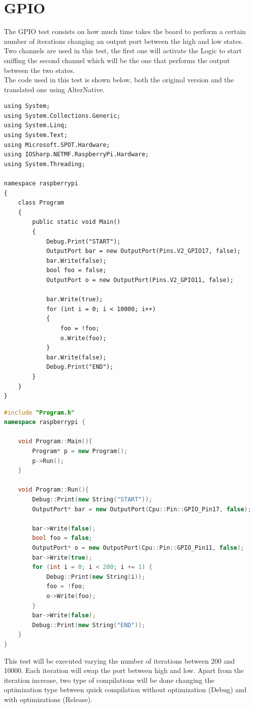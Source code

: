 \section{GPIO}\label{SS:IOEx-GPIO}
The GPIO test consists on how much time takes the board to perform a certain number of iterations changing an output port between the high and low states. Two channels are used in this test, the first one will activate the Logic to start sniffing the second channel which will be the one that performs the output between the two states.
\\
The code used in this test is shown below, both the original version and the translated one using AlterNative.
\begin{lstlisting}[language=CSharp, caption={GPIO Performance test in C\#}]
using System;
using System.Collections.Generic;
using System.Linq;
using System.Text;
using Microsoft.SPOT.Hardware;
using IOSharp.NETMF.RaspberryPi.Hardware;
using System.Threading;

namespace raspberrypi
{
    class Program
    {
        public static void Main()
        {
            Debug.Print("START");
            OutputPort bar = new OutputPort(Pins.V2_GPIO17, false);
            bar.Write(false);
            bool foo = false;
            OutputPort o = new OutputPort(Pins.V2_GPIO11, false);

            bar.Write(true);
            for (int i = 0; i < 10000; i++)
            {
                foo = !foo;
                o.Write(foo);
            }
            bar.Write(false);
            Debug.Print("END");
        }
    }
}
\end{lstlisting}

\begin{lstlisting}[language=C++, caption={GPIO Performance translated to C++}]
#include "Program.h"
namespace raspberrypi {

	void Program::Main(){
		Program* p = new Program();
		p->Run();
	}

	void Program::Run(){
		Debug::Print(new String("START"));
		OutputPort* bar = new OutputPort(Cpu::Pin::GPIO_Pin17, false);
	
		bar->Write(false);
		bool foo = false;
		OutputPort* o = new OutputPort(Cpu::Pin::GPIO_Pin11, false);
		bar->Write(true);
		for (int i = 0; i < 200; i += 1) {
			Debug::Print(new String(i));
			foo = !foo;
			o->Write(foo);
		}
		bar->Write(false);
		Debug::Print(new String("END"));
	}
}
\end{lstlisting}

This test will be executed varying the number of iterations between 200 and 10000. Each iteration will swap the port between high and low. Apart from the iteration increase, two type of compilations will be done changing the optimization type between quick compilation without optimization (Debug) and with optimizations (Release).

